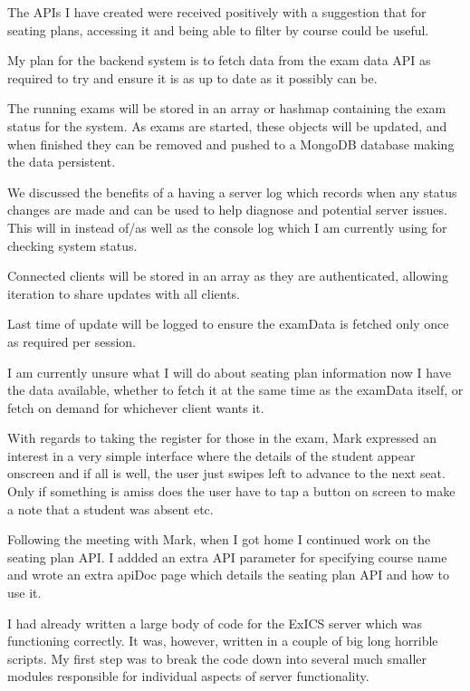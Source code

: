 \documentclass[idxtotoc,hyperref,openany]{labbook} %
\begin{document}
The APIs I have created were received positively with a suggestion that for seating plans, accessing it and being able to filter by course could be useful.

My plan for the backend system is to fetch data from the exam data API as required to try and ensure it is as up to date as it possibly can be.

The running exams will be stored in an array or hashmap containing the exam status for the system.  As exams are started, these objects will be updated, and when finished they can be removed and pushed to a MongoDB database making the data persistent.

We discussed the benefits of a having a server log which records when any status changes are made and can be used to help diagnose and potential server issues.  This will in instead of/as well as the console log which I am currently using for checking system status.

Connected clients will be stored in an array as they are authenticated, allowing iteration to share updates with all clients.

Last time of update will be logged to ensure the examData is fetched only once as required per session.

I am currently unsure what I will do about seating plan information now I have the data available, whether to fetch it at the same time as the examData itself, or fetch on demand for whichever client wants it.

With regards to taking the register for those in the exam, Mark expressed an interest in a very simple interface where the details of the student appear onscreen and if all is well, the user just swipes left to advance to the next seat.  Only if something is amiss does the user have to tap a button on screen to make a note that a student was absent etc.


Following the meeting with Mark, when I got home I continued work on the seating plan API.  I addded an extra API parameter for specifying course name and wrote an extra apiDoc page which details the seating plan API and how to use it.


I had already written a large body of code for the ExICS server which was functioning correctly.  It was, however, written in a couple of big long horrible scripts.  My first step was to break the code down into several much smaller modules responsible for individual aspects of server functionality.
\end{document}
